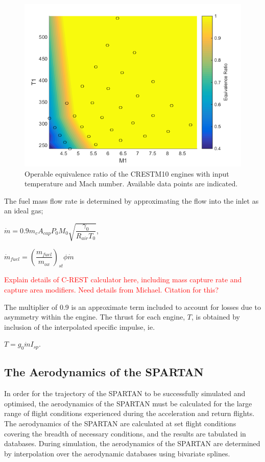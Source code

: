 \begin{figure}[ht]
	\centering
	\includegraphics[width=0.6\linewidth]{figures/3_vehicle_design/EquivalenceRatioInterp}
	\caption{Operable equivalence ratio of the CRESTM10 engines with input temperature and Mach number. Available data points are indicated.}
	\label{fig:EquivalenceRatioInterp}
\end{figure}
The fuel mass flow rate is determined by approximating the flow into the inlet as an ideal gas; 

$\dot{m} = 0.9 m_c A_{cap} P_0 M_0 \sqrt{\dfrac{\gamma_0}{R_{air} T_0}}$,

$\dot{m}_{fuel} = (\dfrac{m_{fuel}}{m_{ox}} )_{st} \phi \dot{m}$

\textcolor{red}{Explain details of C-REST calculator here, including mass capture rate and capture area modifiers. Need details from Michael. Citation for this?}

The multiplier of 0.9 is an approximate term included to account for losses due to asymmetry within the engine. 
The thrust for each engine, $T$, is obtained by inclusion of the interpolated specific impulse, ie. 

$T = g_0\dot{m}I_{sp}$. 







		
		
		\subsection{The Aerodynamics of the SPARTAN}\label{sec:aero}
		
In order for the trajectory of the SPARTAN to be successfully simulated and optimised, the aerodynamics of the SPARTAN must be calculated for the large range of flight conditions experienced during the acceleration and return flights. 
The aerodynamics of the SPARTAN are calculated at set flight conditions covering the breadth of necessary conditions, and the results are tabulated in databases. During simulation, the aerodynamics of the SPARTAN are determined by interpolation over the aerodynamic databases using bivariate splines. 


